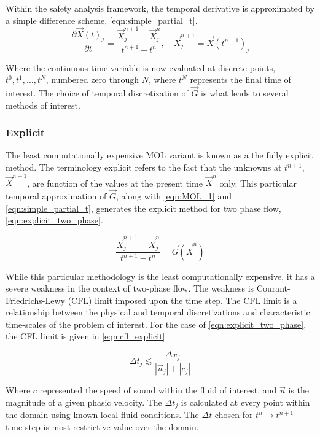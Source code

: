 Within the safety analysis framework, the temporal derivative is approximated by a simple difference scheme, \eqref{eqn:simple_partial_t}.
\begin{equation}
\label{eqn:simple_partial_t}
\frac{\partial \vec{X}(t)_j}{\partial t} = \frac{ \vec{X}^{n+1}_{j} - \vec{X}^{n}_{j}}{t^{n+1}-t^{n}}, \quad \vec{X}^{n+1}_j = \vec{X}(t^{n+1})_j
\end{equation}

Where the continuous time variable is now evaluated at discrete points, $t^0, t^1, \ldots, t^N$, numbered zero through $N$, where $t^N$ represents the final time of interest.
The choice of temporal discretization of $\vec{G}$ is what leads to several methods of interest.

\subsubsection{Explicit}
\label{subsubsect:numerics_explicit}
The least computationally expensive MOL variant is known as a the fully explicit method.
The terminology explicit refers to the fact that the unknowns at $t^{n+1}$, $\vec{X}^{n+1}$, are function of the values at the present time $\vec{X}^{n}$ only.
This particular temporal approximation of $\vec{G}$, along with \eqref{eqn:MOL_1} and \eqref{eqn:simple_partial_t}, generates the explicit method for two phase flow, \eqref{eqn:explicit_two_phase}.

\begin{equation}
\label{eqn:explicit_two_phase}
\frac{ \vec{X}^{n+1}_{j} - \vec{X}^{n}_{j}}{t^{n+1}-t^{n}} = \vec{G}(\vec{X}^{n})
\end{equation}

While this particular methodology is the least computationally expensive, it has a severe weakness in the context of two-phase flow.
The weakness is Courant-Friedrichs-Lewy (CFL) limit imposed upon the time step.
The CFL limit is a relationship between the physical and temporal discretizations and characteristic time-scales of the problem of interest.
For the case of \eqref{eqn:explicit_two_phase}, the CFL limit is given in \eqref{eqn:cfl_explicit}.

\begin{equation}
\label{eqn:cfl_explicit}
\Delta t_j \lesssim \frac{\Delta x_j}{|\vec{u}_j|+|c_j|}
\end{equation}

Where $c$ represented the speed of sound within the fluid of interest, and $\vec{u}$ is the magnitude of a given phasic velocity.
The $\Delta t_j$ is calculated at every point within the domain using known local fluid conditions.
The $\Delta t$ chosen for $t^{n} \rightarrow t^{n+1}$ time-step is most restrictive value over the domain.


